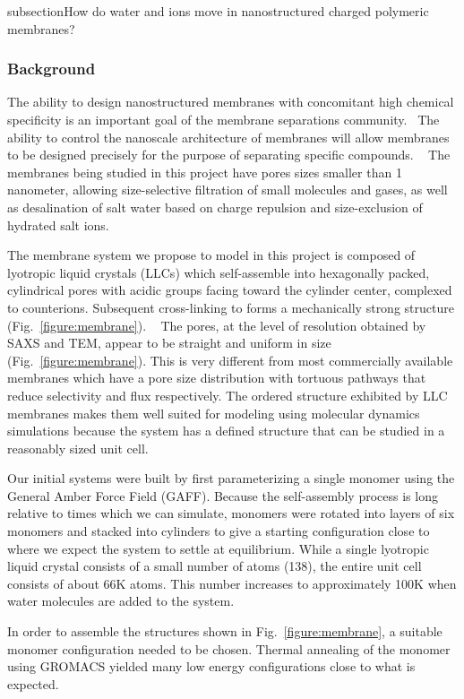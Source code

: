 subsection{How do water and ions move in nanostructured charged polymeric membranes?}
\subsubsection*{Background} 

The ability to design nanostructured membranes with concomitant high chemical
specificity is an important goal of the membrane separations
community.~\cite{Humplik2011} The ability to control
the nanoscale architecture of membranes will allow membranes to be 
designed precisely for the purpose of separating specific compounds.
~\cite{SmithRC1997,Zhu2006} The membranes being studied in this project
have pores sizes smaller than 1 nanometer, allowing size-selective 
filtration of small molecules and gases, as well as desalination of salt
water based on charge repulsion and size-exclusion of hydrated salt ions.

The membrane system we propose to model in this project is composed of
lyotropic liquid crystals (LLCs) which self-assemble into hexagonally
packed, cylindrical pores with acidic groups facing toward the cylinder
center, complexed to counterions. Subsequent cross-linking to forms
a mechanically strong structure (Fig.~\ref{figure:membrane}).
~\cite{Zhou2003,Feng2014,Feng2016} The pores, at the level of resolution
obtained by SAXS and TEM, appear to be straight and uniform in size 
(Fig.~\ref{figure:membrane}).  This is very different from most 
commercially available membranes which have a pore size distribution
with tortuous pathways that reduce selectivity and flux respectively.
The ordered structure exhibited by LLC membranes makes them well suited 
for modeling using molecular dynamics simulations because the
system has a defined structure that can be studied in a reasonably sized 
unit cell.

Our initial systems were built by first parameterizing a single
monomer using the General Amber Force Field (GAFF). Because the
self-assembly process is long relative to times which we can simulate,
monomers were rotated into layers of six monomers and stacked into
cylinders to give a starting configuration close to where we expect
the system to settle at equilibrium. While a single lyotropic liquid
crystal consists of a small number of atoms (138), the entire unit
cell consists of about 66K atoms. This number increases to 
approximately 100K when water molecules are added to the system.

In order to assemble the structures shown in Fig.~\ref{figure:membrane}, a
suitable monomer configuration needed to be chosen. Thermal annealing
of the monomer using GROMACS yielded many low energy configurations
close to what is expected. 

